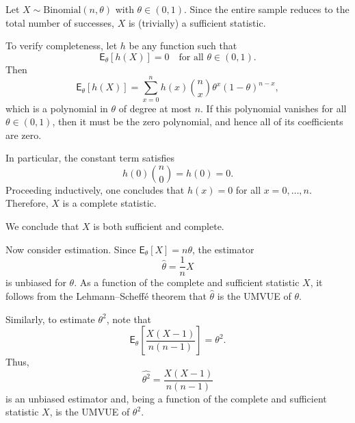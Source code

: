 \begin{ex}
    \label{ex:bin}
Let \(X \sim \mathrm{Binomial}(n,\theta)\) with \(\theta\in(0,1)\).
Since the entire sample reduces to the total number of successes, \(X\) is (trivially) a sufficient statistic.

To verify completeness, let \(h\) be any function such that
\[
\mathsf{E}_{\theta}[h(X)] = 0
\quad \text{for all } \theta\in(0,1).
\]
Then
\[
\mathsf{E}_{\theta}[h(X)]
= \sum_{x=0}^{n} h(x)\binom{n}{x}\theta^{x}(1-\theta)^{n-x},
\]
which is a polynomial in \(\theta\) of degree at most \(n\).
If this polynomial vanishes for all \(\theta\in(0,1)\), then it must be the zero polynomial, and hence all of its coefficients are zero.

In particular, the constant term satisfies
\[
h(0)\binom{n}{0} = h(0) = 0.
\]
Proceeding inductively, one concludes that \(h(x)=0\) for all \(x=0,\dots,n\).
Therefore, \(X\) is a complete statistic.

We conclude that \(X\) is both sufficient and complete.

Now consider estimation. Since \(\mathsf{E}_{\theta}[X]=n\theta\), the estimator
\[
\hat{\theta} = \frac{1}{n}X
\]
is unbiased for \(\theta\).
As a function of the complete and sufficient statistic \(X\), it follows from the Lehmann--Scheff\'e theorem that \(\hat{\theta}\) is the UMVUE of \(\theta\).

Similarly, to estimate \(\theta^{2}\), note that
\[
\mathsf{E}_{\theta}\!\left[\frac{X(X-1)}{n(n-1)}\right] = \theta^{2}.
\]
Thus,
\[
\widehat{\theta^{2}} = \frac{X(X-1)}{n(n-1)}
\]
is an unbiased estimator and, being a function of the complete and sufficient statistic \(X\), is the UMVUE of \(\theta^{2}\).
\end{ex}

